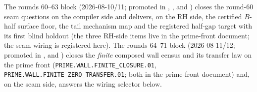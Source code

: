 \documentclass[11pt,a4paper]{article}
\begin{document}
\par\smallskip\noindent The rounds 60--63 block (2026-08-10/11;
promoted in ,
,
 and
) closes the round-60
seam questions on the compiler side and delivers, on the RH
side, the certified $B$-half surface floor, the tail mechanism
map and the registered half-gap target with its first blind
holdout (the three RH-side items live in the prime-front
document; the seam wiring is registered here).  The rounds
64--71 block (2026-08-11/12; promoted in
,
 and
) closes the \emph{finite}
composed wall census and its transfer law on the prime front
(\texttt{PRIME.WALL.FINITE\_CLOSURE.01},
\texttt{PRIME.WALL.FINITE\_ZERO\_TRANSFER.01}; both in the
prime-front document) and, on the seam side, answers the wiring
selector below.
\end{document}
